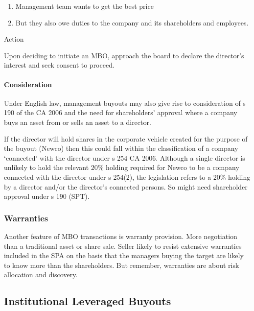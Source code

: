 \documentclass[
]{article}
\providecommand{\tightlist}{%
  \setlength{\itemsep}{0pt}\setlength{\parskip}{0pt}}
\newenvironment{env-0fd99421-2bbe-4c93-bdcb-b11371f3d791}
{
    \savenotes\tcolorbox[blanker,breakable,left=5pt,borderline west={2pt}{-4pt}{aquamarine}]
}
{
    \endtcolorbox\spewnotes
}
\begin{document}
\begin{enumerate}
\tightlist
\item
  Management team wants to get the best price
\item
  But they also owe duties to the company and its shareholders and
  employees.
\end{enumerate}

\begin{env-0fd99421-2bbe-4c93-bdcb-b11371f3d791}

Action

Upon deciding to initiate an MBO, approach the board to declare the
director's interest and seek consent to proceed.

\end{env-0fd99421-2bbe-4c93-bdcb-b11371f3d791}

\hypertarget{consideration}{%
\paragraph{Consideration}\label{consideration}}

Under English law, management buyouts may also give rise to
consideration of s 190 of the CA 2006 and the need for shareholders'
approval where a company buys an asset from or sells an asset to a
director.

If the director will hold shares in the corporate vehicle created for
the purpose of the buyout (Newco) then this could fall within the
classification of a company `connected' with the director under s 254 CA
2006. Although a single director is unlikely to hold the relevant 20\%
holding required for Newco to be a company connected with the director
under s 254(2), the legislation refers to a 20\% holding by a director
and/or the director's connected persons. So might need shareholder
approval under s 190 (SPT).

\hypertarget{warranties}{%
\subsubsection{Warranties}\label{warranties}}

Another feature of MBO transactions is warranty provision. More
negotiation than a traditional asset or share sale. Seller likely to
resist extensive warranties included in the SPA on the basis that the
managers buying the target are likely to know more than the
shareholders. But remember, warranties are about risk allocation and
discovery.

\hypertarget{institutional-leveraged-buyouts}{%
\subsection{Institutional Leveraged
Buyouts}\label{institutional-leveraged-buyouts}}
\end{document}
